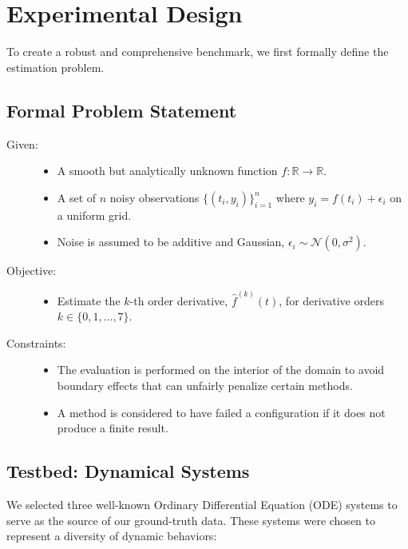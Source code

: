 \section{Experimental Design}
\label{sec:design}

To create a robust and comprehensive benchmark, we first formally define the estimation problem.

\subsection{Formal Problem Statement}
\label{sec:problem_statement}

\begin{description}
    \item[Given:]
    \begin{itemize}
        \item A smooth but analytically unknown function $f: \mathbb{R} \to \mathbb{R}$.
        \item A set of $n$ noisy observations $\{(t_i, y_i)\}_{i=1}^n$ where $y_i = f(t_i) + \epsilon_i$ on a uniform grid.
        \item Noise is assumed to be additive and Gaussian, $\epsilon_i \sim \mathcal{N}(0, \sigma^2)$.
    \end{itemize}
    \item[Objective:]
    \begin{itemize}
        \item Estimate the $k$-th order derivative, $\hat{f}^{(k)}(t)$, for derivative orders $k \in \{0, 1, \ldots, 7\}$.
    \end{itemize}
    \item[Constraints:]
    \begin{itemize}
        \item The evaluation is performed on the interior of the domain to avoid boundary effects that can unfairly penalize certain methods.
        \item A method is considered to have failed a configuration if it does not produce a finite result.
    \end{itemize}
\end{description}

\subsection{Testbed: Dynamical Systems}
\label{sec:test_systems}

We selected three well-known Ordinary Differential Equation (ODE) systems to serve as the source of our ground-truth data. These systems were chosen to represent a diversity of dynamic behaviors:

